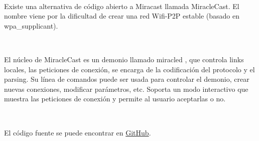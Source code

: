 \

Existe una alternativa de código abierto a Miracast llamada MiracleCast. El nombre viene por la dificultad de crear una red Wifi-P2P estable (basado en wpa\_supplicant).

\

El núcleo de MiracleCast es un demonio llamado miracled \cite{MiracleCast}, que controla links locales, las peticiones de conexión, se encarga de la codificación del protocolo y el parsing.
Su línea de comandos puede ser usada para controlar el demonio, crear nuevas conexiones, modificar parámetros, etc.
Soporta un modo interactivo que muestra las peticiones de conexión y permite al usuario aceptarlas o no.

\

El código fuente se puede encontrar en \href{https://github.com/albfan/miraclecast}{GitHub}.
